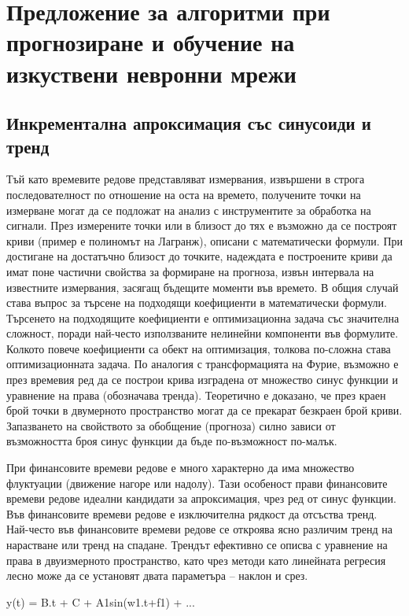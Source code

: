 ﻿\chapter{Предложение за алгоритми при прогнозиране и обучение на изкуствени невронни мрежи}

\section{Инкрементална апроксимация със синусоиди и тренд}

Тъй като времевите редове представляват измервания, извършени в строга последователност по отношение на оста на времето, получените точки на измерване могат да се подложат на анализ с инструментите за обработка на сигнали. През измерените точки или в близост до тях е възможно да се построят криви (пример е полиномът на Лагранж), описани с математически формули. При достигане на достатъчно близост до точките, надеждата е построените криви да имат поне частични свойства за формиране на прогноза, извън интервала на известните измервания, засягащ бъдещите моменти във времето. В общия случай става въпрос за търсене на подходящи коефициенти в математически формули. Търсенето на подходящите коефициенти е оптимизационна задача със значителна сложност, поради най-често използваните нелинейни компоненти във формулите. Колкото повече коефициенти са обект на оптимизация, толкова по-сложна става оптимизационната задача. По аналогия с трансформацията на Фурие, възможно е през времевия ред да се построи крива изградена от множество синус функции и уравнение на права (обозначава тренда). Теоретично е доказано, че през краен брой точки в двумерното пространство могат да се прекарат безкраен брой криви. Запазването на свойството за обобщение (прогноза) силно зависи от възможността броя синус функции да бъде по-възможност по-малък. 

При финансовите времеви редове е много характерно да има множество флуктуации (движение нагоре или надолу). Тази особеност прави финансовите времеви редове идеални кандидати за апроксимация, чрез ред от синус функции. Във финансовите времеви редове е изключителна рядкост да отсъства тренд. Най-често във финансовите времеви редове се откроява ясно различим тренд на нарастване или тренд на спадане. Трендът ефективно се описва с уравнение на права в двуизмерното пространство, като чрез методи като линейната регресия лесно може да се установят двата параметъра – наклон и срез. 

y(t) = B.t + C + A1sin(w1.t+f1) + ...

